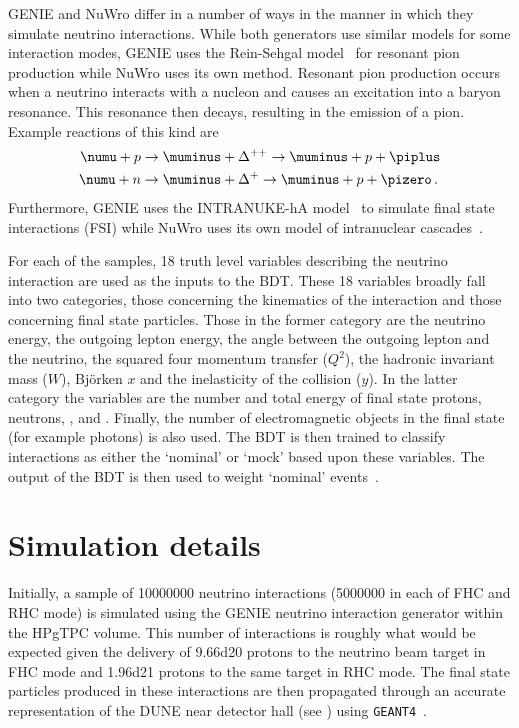 GENIE and NuWro differ in a number of ways in the manner in which they simulate neutrino interactions.
While both generators use similar models for some interaction modes, GENIE uses the Rein-Sehgal model~\cite{reinSehgal} for resonant pion production while NuWro uses its own method.
Resonant pion production occurs when a neutrino interacts with a nucleon and causes an excitation into a baryon resonance. 
This resonance then decays, resulting in the emission of a pion.
Example reactions of this kind are 
\begin{align}
	\numu + p &\rightarrow \muminus + \Delta^{++} \rightarrow \muminus + p + \piplus \\
	\numu + n &\rightarrow \muminus + \Delta^{+} \rightarrow \muminus + p + \pizero \, . 
\end{align}
Furthermore, GENIE uses the INTRANUKE-hA model~\cite{intranuke} to simulate final state interactions (FSI) while NuWro uses its own model of intranuclear cascades~\cite{nuwroCascade}.

For each of the samples, 18 truth level variables describing the neutrino interaction are used as the inputs to the BDT.
These 18 variables broadly fall into two categories, those concerning the kinematics of the interaction and those concerning final state particles. Those in the former category are the neutrino energy, the outgoing lepton energy, the angle between the outgoing lepton and the neutrino, the squared four momentum transfer ($Q^{2}$), the hadronic invariant mass ($W$), Bj\"orken $x$ and the inelasticity of the collision ($y$).
In the latter category the variables are the number and total energy of final state protons, neutrons, \piplus, \piminus and \pizero. 
Finally, the number of electromagnetic objects in the final state (for example photons) is also used.
The BDT is then trained to classify interactions as either the `nominal' or `mock' based upon these variables.
The output of the BDT is then used to weight `nominal' events~\cite{vilelaBDT}.

\section{Simulation details}
\label{sec:dune_ndrwt:simDetails}

Initially, a sample of \num{10000000} neutrino interactions (\num{5000000} in each of FHC and RHC mode) is simulated using the GENIE neutrino interaction generator within the HPgTPC volume.
This number of interactions is roughly what would be expected given the delivery of \num{9.66d20} protons to the neutrino beam target in FHC mode and \num{1.96d21} protons to the same target in RHC mode.
The final state particles produced in these interactions are then propagated through an accurate representation of the DUNE near detector hall (see ) using \texttt{GEANT4}~\cite{geant}. 
 
